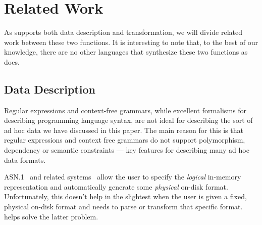 \section{Related Work}
\label{sec:related-work}


As \datatype{} supports both data description and transformation, we
will divide related work between these two functions. It is
interesting to note that, to the best of our knowledge, there are no
other languages that synthesize these two functions as \datatype{}
does.

\subsection{Data Description}
Regular
expressions and context-free grammars, while excellent formalisms for
describing programming language syntax, are not ideal for describing
the sort of ad hoc data we have discussed in this paper.  The main
reason for this is that regular expressions and context free grammars
do not support polymorphism, dependency or semantic constraints ---
key features for describing many ad hoc data formats.

ASN.1~\cite{asn} and related systems~\cite{asdl} allow the user to
specify the {\em logical} in-memory representation and
automatically generate some 
{\em physical} on-disk format. 
Unfortunately, this doesn't help in the slightest when the user is
given a fixed, physical on-disk format and needs to parse or transform
that specific format.  \datatype{} helps solve
the latter problem.


